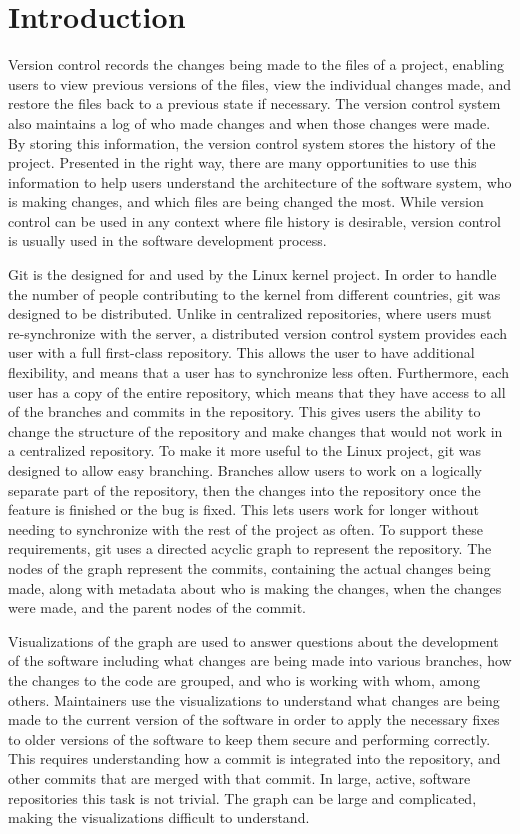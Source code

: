 \chapter{Introduction}

Version control records the changes being made to the files of a
project, enabling users to view previous versions of the files, view the
individual changes made, and restore the files back to a previous state
if necessary. The version control system also maintains a log of who
made changes and when those changes were made. By storing this
information, the version control system stores the history of the
project. Presented in the right way, there are many opportunities to use
this information to help users understand the architecture of the
software system, who is making changes, and which files are being
changed the most. While version control can be used in any context where
file history is desirable, version control is usually used in the
software development process.

Git is the  designed for and used by
the Linux kernel project. In order to handle the number of people
contributing to the kernel from different countries, git was designed to
be distributed. Unlike in centralized repositories, where users must
re-synchronize with the server, a distributed version control system
provides each user with a full first-class repository. This allows the
user to have additional flexibility, and means that a user has to
synchronize less often. Furthermore, each user has a copy of the entire
repository, which means that they have access to all of the branches and
commits in the repository. This gives users the ability to change the
structure of the repository and make changes that would not work in a
centralized repository. To make it more useful to the Linux project, git
was designed to allow easy branching. Branches allow users to work on a
logically separate part of the repository, then the changes into the
repository once the feature is finished or the bug is fixed. This lets
users work for longer without needing to synchronize with the rest of
the project as often. To support these requirements, git uses a directed
acyclic graph to represent the repository. The nodes of the graph
represent the commits, containing the actual changes being made, along
with metadata about who is making the changes, when the changes were
made, and the parent nodes of the commit.

Visualizations of the graph are used to answer questions about the
development of the software including what changes are being made into
various branches, how the changes to the code are grouped, and who is
working with whom, among others. Maintainers use the visualizations to
understand what changes are being made to the current version of the
software in order to apply the necessary fixes to older versions of the
software to keep them secure and performing correctly. This requires
understanding how a commit is integrated into the repository, and other
commits that are merged with that commit. In large, active, software
repositories this task is not trivial. The graph can be large and
complicated, making the visualizations difficult to understand.

